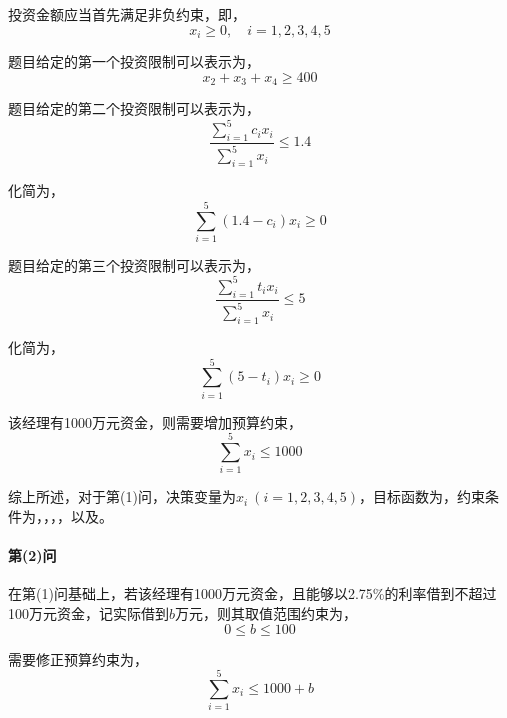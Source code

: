 \documentclass[12pt,a4paper]{article}
\begin{document}
投资金额应当首先满足非负约束，即，
\begin{equation}\label{eq:ex6_nonneg}
    x_i \ge 0, \quad i = 1,2,3,4,5
\end{equation}

题目给定的第一个投资限制可以表示为，
\begin{equation}\label{eq:ex6_cond1}
    x_2 + x_3 + x_4 \ge 400
\end{equation}

题目给定的第二个投资限制可以表示为，
\begin{equation}
    \frac{\sum_{i=1}^5 c_i x_i}{\sum_{i=1}^5 x_i} \le 1.4
\end{equation}

化简为，
\begin{equation}\label{eq:ex6_cond2}
    \sum_{i=1}^5 (1.4-c_i)x_i \ge 0
\end{equation}

题目给定的第三个投资限制可以表示为，
\begin{equation}
    \frac{\sum_{i=1}^5 t_i x_i}{\sum_{i=1}^5 x_i} \le 5
\end{equation}

化简为，
\begin{equation}\label{eq:ex6_cond3}
    \sum_{i=1}^5 (5-t_i) x_i \ge 0
\end{equation}

该经理有1000万元资金，则需要增加预算约束，
\begin{equation}\label{eq:ex6_budget1}
    \sum_{i=1}^5 x_i \le 1000
\end{equation}

综上所述，对于第(1)问，决策变量为$x_i\ (i=1,2,3,4,5)$，目标函数为，约束条件为，，，，以及。

\paragraph{第(2)问} 在第(1)问基础上，若该经理有1000万元资金，且能够以2.75\%的利率借到不超过100万元资金，记实际借到$b$万元，则其取值范围约束为，
\begin{equation}\label{eq:ex6_borrow}
    0 \le b \le 100
\end{equation}

需要修正预算约束为，
\begin{equation}\label{eq:ex6_budget2}
    \sum_{i=1}^5 x_i \le 1000 + b
\end{equation}
\end{document}
